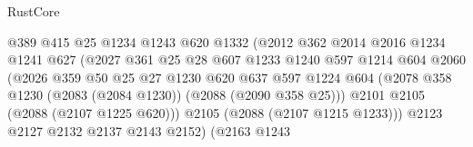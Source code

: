 \begin{lexlean}{RustCore}
\begin{coremodule}
                                      @389
                                      @415
                                      @25
                                      @1234
                                      @1243
                                      @620
                                      @1332
                                      (@2012
                                        @362
                                        @2014
                                        @2016
                                        @1234
                                        @1241
                                        @627
                                        (@2027
                                          @361
                                          @25
                                          @28
                                          @607
                                          @1233
                                          @1240
                                          @597
                                          @1214
                                          @604
                                          @2060
                                          (@2026
                                            @359
                                            @50
                                            @25
                                            @27
                                            @1230
                                            @620
                                            @637
                                            @597
                                            @1224
                                            @604
                                            (@2078
                                              @358
                                              @1230
                                              (@2083 (@2084 @1230))
                                              (@2088 (@2090 @358 @25)))
                                            @2101
                                            @2105
                                            (@2088 (@2107 @1225 @620)))
                                          @2105
                                          (@2088 (@2107 @1215 @1233)))
                                        @2123
                                        @2127
                                        @2132
                                        @2137
                                        @2143
                                        @2152)
                                      (@2163
                                        @1243

\end{coremodule}
\end{lexlean}

